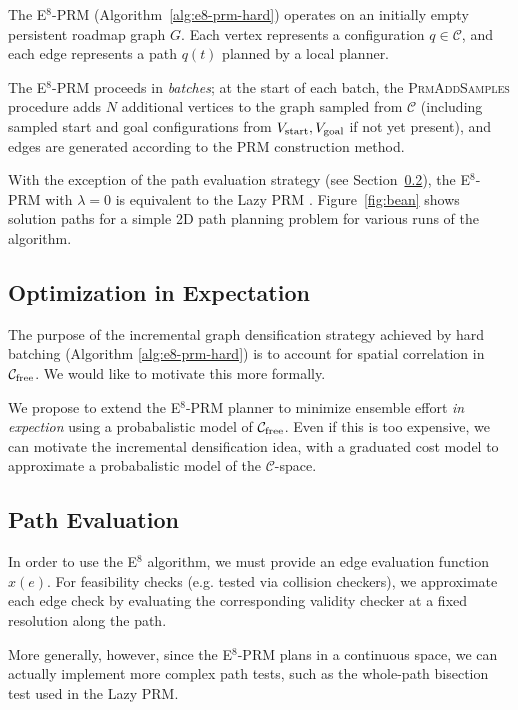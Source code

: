 The E$^8$-PRM (Algorithm~\ref{alg:e8-prm-hard})
operates on an initially empty persistent roadmap graph $G$.
Each vertex represents a configuration $q \in \mathcal{C}$,
and each edge represents a path $q(t)$ planned by a local planner.

The E$^8$-PRM proceeds in \emph{batches};
at the start of each batch,
the \textsc{PrmAddSamples} procedure adds
$N$ additional vertices to the graph sampled from $\mathcal{C}$
(including sampled start and goal configurations from
$V_{\mbox{\scriptsize start}}, V_{\mbox{\scriptsize goal}}$
if not yet present),
and edges are generated according to the PRM construction method.

With the exception of the path evaluation strategy
(see Section~\ref{subsec:prm-path-eval}),
the E$^8$-PRM with $\lambda = 0$
is equivalent to 
the Lazy PRM \citep{bohlin2000lazyprm}.
Figure~\ref{fig:bean} shows solution paths for a simple
2D path planning problem for various runs of the algorithm.

\subsection{Optimization in Expectation}

The purpose of the incremental graph densification strategy
achieved by hard batching (Algorithm \ref{alg:e8-prm-hard})
is to account for spatial correlation
in $\mathcal{C}_{\mbox{\scriptsize free}}$.
We would like to motivate this more formally.

We propose to extend the E$^8$-PRM planner
to minimize ensemble effort \emph{in expection}
using a probabalistic model of $\mathcal{C}_{\mbox{\scriptsize free}}$.
Even if this is too expensive,
we can motivate the incremental densification idea,
with a graduated cost model
to approximate a probabalistic model
of the $\mathcal{C}$-space.

\subsection{Path Evaluation}
\label{subsec:prm-path-eval}

In order to use the E$^8$ algorithm,
we must provide an edge evaluation function $x(e)$.
For feasibility checks
(e.g. tested via collision checkers),
we approximate each edge check
by evaluating the corresponding validity checker
at a fixed resolution along the path.

More generally, however,
since the E$^8$-PRM plans in a continuous space,
we can actually implement more complex path tests,
such as the whole-path bisection test used in the
Lazy PRM.

